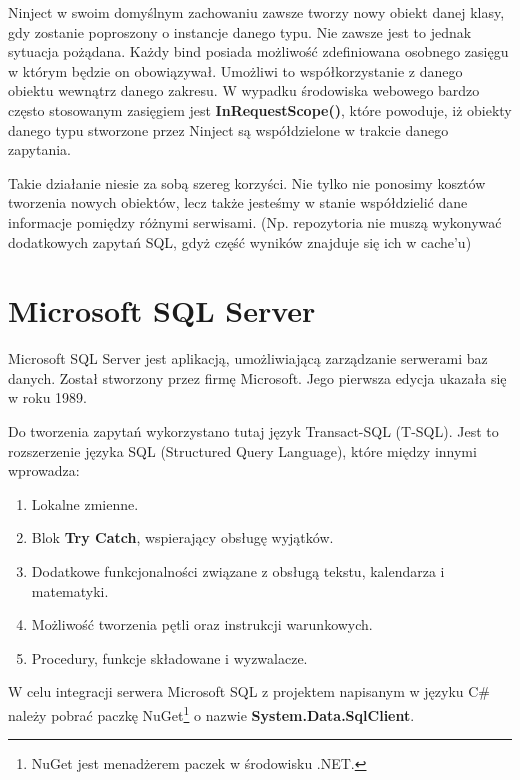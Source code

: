 Ninject w swoim domyślnym zachowaniu zawsze tworzy nowy obiekt danej klasy, gdy zostanie poproszony o instancje danego typu. Nie zawsze jest to jednak sytuacja pożądana. Każdy bind posiada możliwość zdefiniowana osobnego zasięgu w którym będzie on obowiązywał. Umożliwi to współkorzystanie z danego obiektu wewnątrz danego zakresu. W wypadku środowiska webowego bardzo często stosowanym zasięgiem jest \textbf{InRequestScope()}, które powoduje, iż obiekty danego typu stworzone przez Ninject są współdzielone w trakcie danego zapytania. 

Takie działanie niesie za sobą szereg korzyści. Nie tylko nie ponosimy kosztów tworzenia nowych obiektów, lecz także jesteśmy w stanie współdzielić dane informacje pomiędzy różnymi serwisami. (Np. repozytoria nie muszą wykonywać dodatkowych zapytań SQL, gdyż część wyników znajduje się ich w cache'u)

\newpage
{\let\cleardoublepage\relax \chapter{Microsoft SQL Server}}

Microsoft SQL Server\cite{SqlServer} jest aplikacją, umożliwiającą zarządzanie serwerami baz danych. Został stworzony przez firmę Microsoft. Jego pierwsza edycja ukazała się w roku 1989.

Do tworzenia zapytań wykorzystano tutaj język Transact-SQL (T-SQL). Jest to rozszerzenie języka SQL (Structured Query Language), które między innymi wprowadza:

\begin{enumerate}
	\item Lokalne zmienne.
	\item Blok \textbf{Try Catch}, wspierający obsługę wyjątków.
	\item Dodatkowe funkcjonalności związane z obsługą tekstu, kalendarza i matematyki.
	\item Możliwość tworzenia pętli oraz instrukcji warunkowych.
	\item Procedury, funkcje składowane i wyzwalacze.
\end{enumerate} 

W celu integracji serwera Microsoft SQL z projektem napisanym w języku C\# należy pobrać paczkę NuGet\footnote{NuGet jest menadżerem paczek w środowisku .NET.\cite{Nuget}} o nazwie \textbf{System.Data.SqlClient}.




